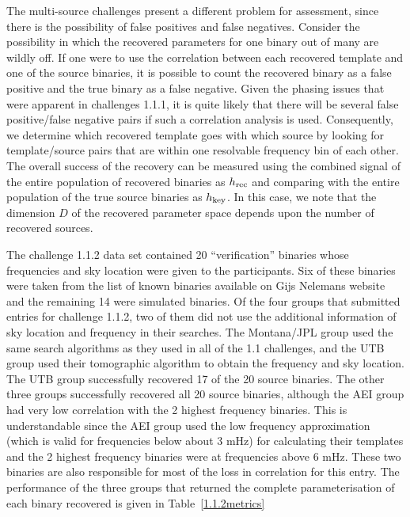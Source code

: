 \documentclass[12pt]{iopart}
\begin{document}
The multi-source challenges present a different problem for assessment, since there is the possibility of false positives and false negatives. Consider the possibility in which the recovered parameters for one binary out of many are wildly off. If one were to use the correlation between each recovered template and one of the source binaries, it is possible to count the recovered binary as a false positive and the true binary as a false negative. Given the phasing issues that were apparent in challenges 1.1.1, it is quite likely that there will be several false positive/false negative pairs if such a correlation analysis is used. Consequently, we determine which recovered template goes with which source by looking for template/source pairs that are within one resolvable frequency bin of each other. The overall success of the recovery can be measured using the combined signal of the entire population of recovered binaries as $h_{\rm rec}$ and comparing with the entire population of the true source binaries as $h_{\rm key}$. In this case, we note that the dimension $D$ of the recovered parameter space depends upon the number of recovered sources.

The challenge 1.1.2 data set contained 20 ``verification'' binaries whose frequencies and sky location were given to the participants. Six of these binaries were taken from the list of known binaries available on Gijs Nelemans website~\cite{nelemanswiki} and the remaining 14 were simulated binaries. Of the four groups that submitted entries for challenge 1.1.2, two of them did not use the additional information of sky location and frequency in their searches. The Montana/JPL group used the same search algorithms as they used in all of the 1.1 challenges, and the UTB group used their tomographic algorithm to obtain the frequency and sky location. The UTB group successfully recovered 17 of the 20 source binaries. The other three groups successfully recovered all 20 source binaries, although the AEI group had very low correlation with the 2 highest frequency binaries. This is understandable since the AEI group used the low frequency approximation (which is valid for frequencies below about 3 mHz) for calculating their templates and the 2 highest frequency binaries were at frequencies above 6 mHz. These two binaries are also responsible for most of the loss in correlation for this entry. The performance of the three groups that returned the complete parameterisation of each binary recovered is given in Table~\ref{1.1.2metrics}
\end{document}
